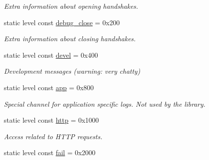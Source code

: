 \begin{DoxyCompactItemize}
\begin{DoxyCompactList}\small\item\em Extra information about opening handshakes. \end{DoxyCompactList}\item 
static level const \hyperlink{structwebsocketpp_1_1log_1_1alevel_a8af43767d3814885f55495bf9f5f4df4}{debug\+\_\+close} = 0x200\hypertarget{structwebsocketpp_1_1log_1_1alevel_a8af43767d3814885f55495bf9f5f4df4}{}\label{structwebsocketpp_1_1log_1_1alevel_a8af43767d3814885f55495bf9f5f4df4}

\begin{DoxyCompactList}\small\item\em Extra information about closing handshakes. \end{DoxyCompactList}\item 
static level const \hyperlink{structwebsocketpp_1_1log_1_1alevel_a65ec21c75999c993c25c72569018f576}{devel} = 0x400\hypertarget{structwebsocketpp_1_1log_1_1alevel_a65ec21c75999c993c25c72569018f576}{}\label{structwebsocketpp_1_1log_1_1alevel_a65ec21c75999c993c25c72569018f576}

\begin{DoxyCompactList}\small\item\em Development messages (warning\+: very chatty) \end{DoxyCompactList}\item 
static level const \hyperlink{structwebsocketpp_1_1log_1_1alevel_aaf67c94a68502c49308489ff01d8d0a8}{app} = 0x800\hypertarget{structwebsocketpp_1_1log_1_1alevel_aaf67c94a68502c49308489ff01d8d0a8}{}\label{structwebsocketpp_1_1log_1_1alevel_aaf67c94a68502c49308489ff01d8d0a8}

\begin{DoxyCompactList}\small\item\em Special channel for application specific logs. Not used by the library. \end{DoxyCompactList}\item 
static level const \hyperlink{structwebsocketpp_1_1log_1_1alevel_af6e731e5771ab1a2267f79e5b9b8183a}{http} = 0x1000\hypertarget{structwebsocketpp_1_1log_1_1alevel_af6e731e5771ab1a2267f79e5b9b8183a}{}\label{structwebsocketpp_1_1log_1_1alevel_af6e731e5771ab1a2267f79e5b9b8183a}

\begin{DoxyCompactList}\small\item\em Access related to H\+T\+TP requests. \end{DoxyCompactList}\item 
static level const \hyperlink{structwebsocketpp_1_1log_1_1alevel_a2e485329910f92f8f6356cf27bafd4a2}{fail} = 0x2000\hypertarget{structwebsocketpp_1_1log_1_1alevel_a2e485329910f92f8f6356cf27bafd4a2}{}\label{structwebsocketpp_1_1log_1_1alevel_a2e485329910f92f8f6356cf27bafd4a2}


\end{DoxyCompactItemize}
